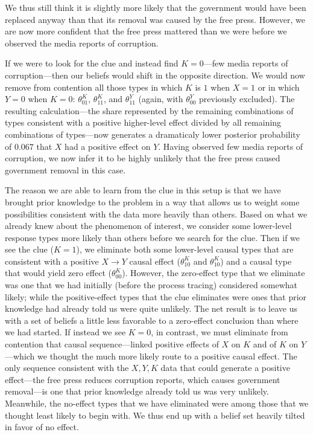 \documentclass[12pt,]{book}
\begin{document}
We thus still think it is slightly more likely that the government would have been replaced anyway than that its removal was caused by the free press. However, we are now more confident that the free press mattered than we were before we observed the media reports of corruption.

If we were to look for the clue and instead find \(K=0\)---few media reports of corruption---then our beliefs would shift in the opposite direction. We would now remove from contention all those types in which \(K\) is \(1\) when \(X=1\) or in which \(Y=0\) when \(K=0\): \(\theta_{01}^{K}\), \(\theta_{11}^{K}\), and \(\theta_{11}^{Y}\) (again, with \(\theta_{00}^{Y}\) previously excluded). The resulting calculation---the share represented by the remaining combinations of types consistent with a positive higher-level effect divided by all remaining combinations of types---now generates a dramaticaly lower posterior probability of \(0.067\) that \(X\) had a positive effect on \(Y\). Having observed few media reports of corruption, we now infer it to be highly unlikely that the free press caused government removal in this case.

The reason we are able to learn from the clue in this setup is that we have brought prior knowledge to the problem in a way that allows us to weight some possibilities consistent with the data more heavily than others. Based on what we already knew about the phenomenon of interest, we consider some lower-level response types more likely than others before we search for the clue. Then if we see the clue (\(K=1\)), we eliminate both some lower-level causal types that are consistent with a positive \(X \rightarrow Y\) causal effect (\(\theta_{10}^{K}\) and \(\theta_{10}^{K}\)) and a causal type that would yield zero effect (\(\theta_{00}^{K}\)). However, the zero-effect type that we eliminate was one that we had initially (before the process tracing) considered somewhat likely; while the positive-effect types that the clue eliminates were ones that prior knowledge had already told us were quite unlikely. The net result is to leave us with a set of beliefs a little less favorable to a zero-effect conclusion than where we had started. If instead we see \(K=0\), in contrast, we must eliminate from contention that causal sequence---linked positive effects of \(X\) on \(K\) and of \(K\) on \(Y\)---which we thought the much more likely route to a positive causal effect. The only sequence consistent with the \(X, Y, K\) data that could generate a positive effect---the free press reduces corruption reports, which causes government removal---is one that prior knowledge already told us was very unlikely. Meanwhile, the no-effect types that we have eliminated were among those that we thought least likely to begin with. We thus end up with a belief set heavily tilted in favor of no effect.
\end{document}
